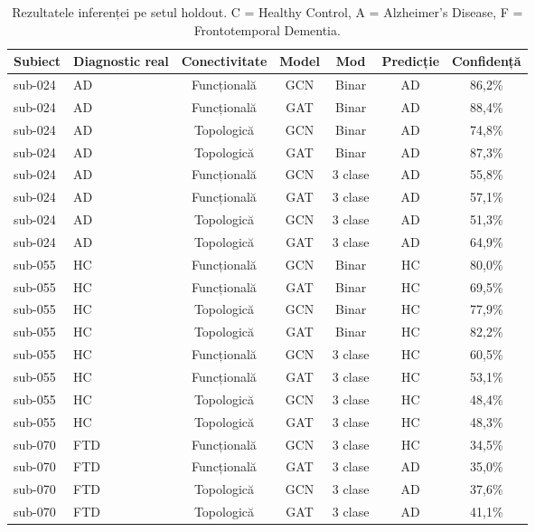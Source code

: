 \documentclass[12pt,a4paper]{report}
\theoremstyle{definition}
\theoremstyle{remark}
\begin{document}
\begin{table}[H]
    \centering
    \caption{Rezultatele inferenței pe setul holdout. C = Healthy Control,
             A = Alzheimer's Disease, F = Frontotemporal Dementia.}
    \label{tab:holdout}
    \begin{tabular}{|l|l|c|c|c|c|c|}
        \hline
        \textbf{Subiect} & \textbf{Diagnostic real} & \textbf{Conectivitate} & \textbf{Model} & \textbf{Mod} & \textbf{Predicție} & \textbf{Confidență} \\
        \hline
        sub-024 & AD & Funcțională & GCN & Binar   & AD & 86,2\% \\
        sub-024 & AD & Funcțională & GAT & Binar   & AD & 88,4\% \\
        sub-024 & AD & Topologică  & GCN & Binar   & AD & 74,8\% \\
        sub-024 & AD & Topologică  & GAT & Binar   & AD & 87,3\% \\
        sub-024 & AD & Funcțională & GCN & 3 clase & AD & 55,8\% \\
        sub-024 & AD & Funcțională & GAT & 3 clase & AD & 57,1\% \\
        sub-024 & AD & Topologică  & GCN & 3 clase & AD & 51,3\% \\
        sub-024 & AD & Topologică  & GAT & 3 clase & AD & 64,9\% \\
        \hline
        sub-055 & HC & Funcțională & GCN & Binar   & HC & 80,0\% \\
        sub-055 & HC & Funcțională & GAT & Binar   & HC & 69,5\% \\
        sub-055 & HC & Topologică  & GCN & Binar   & HC & 77,9\% \\
        sub-055 & HC & Topologică  & GAT & Binar   & HC & 82,2\% \\
        sub-055 & HC & Funcțională & GCN & 3 clase & HC & 60,5\% \\
        sub-055 & HC & Funcțională & GAT & 3 clase & HC & 53,1\% \\
        sub-055 & HC & Topologică  & GCN & 3 clase & HC & 48,4\% \\
        sub-055 & HC & Topologică  & GAT & 3 clase & HC & 48,3\% \\
        \hline
        sub-070 & FTD & Funcțională & GCN & 3 clase & HC & 34,5\% \\
        sub-070 & FTD & Funcțională & GAT & 3 clase & AD & 35,0\% \\
        sub-070 & FTD & Topologică  & GCN & 3 clase & AD & 37,6\% \\
        sub-070 & FTD & Topologică  & GAT & 3 clase & AD & 41,1\% \\
        \hline
    \end{tabular}
\end{table}
\end{document}
